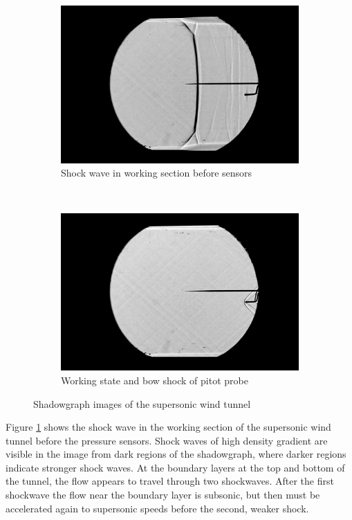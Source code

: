 \documentclass[8pt]{article}
\begin{document}
\begin{figure}[H]
    \centering
    \begin{subfigure}[t]{0.48\textwidth}
        \centering
        \includegraphics[width=1\textwidth]{starting_shock.jpg}
        \caption{Shock wave in working section before sensors}

        \label{fig:figure6}
    \end{subfigure}
    ~
    \begin{subfigure}[t]{0.48\textwidth}
        \centering
        \includegraphics[width=1\textwidth]{working_state.jpg}
        \caption{Working state and bow shock of pitot probe}
        \label{fig:figure7}
    \end{subfigure}
    \caption{Shadowgraph images of the supersonic wind tunnel}
\end{figure}

Figure \ref{fig:figure6} shows the shock wave in the working section of the supersonic wind tunnel before the pressure sensors.
Shock waves of high density gradient are visible in the image from dark regions of the shadowgraph, where darker regions indicate stronger shock waves.
At the boundary layers at the top and bottom of the tunnel, the flow appears to travel through two shockwaves.
After the first shockwave the flow near the boundary layer is subsonic, but then must be accelerated again to supersonic speeds before the second, weaker shock.
\end{document}
